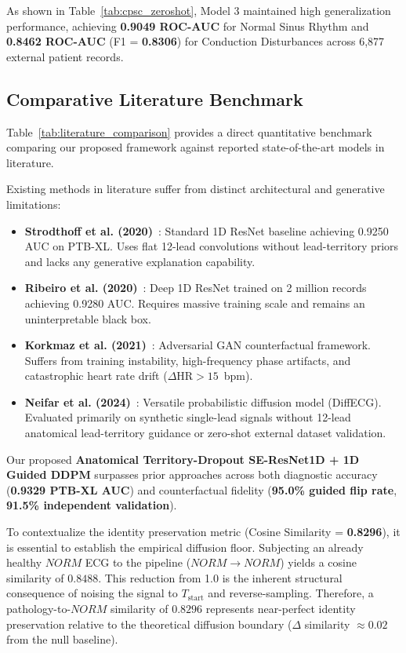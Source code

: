 \documentclass[12pt]{elsarticle}
\begin{document}
As shown in Table~\ref{tab:cpsc_zeroshot}, Model 3 maintained high generalization performance, achieving \textbf{0.9049 ROC-AUC} for Normal Sinus Rhythm and \textbf{0.8462 ROC-AUC} (F1 = \textbf{0.8306}) for Conduction Disturbances across 6,877 external patient records.

\subsection{Comparative Literature Benchmark}
Table~\ref{tab:literature_comparison} provides a direct quantitative benchmark comparing our proposed framework against reported state-of-the-art models in literature.

Existing methods in literature suffer from distinct architectural and generative limitations:
\begin{itemize}
    \item \textbf{Strodthoff et al. (2020)}~\cite{strodthoff2020deep}: Standard 1D ResNet baseline achieving 0.9250 AUC on PTB-XL. Uses flat 12-lead convolutions without lead-territory priors and lacks any generative explanation capability.
    \item \textbf{Ribeiro et al. (2020)}~\cite{ribeiro2020automatic}: Deep 1D ResNet trained on 2 million records achieving 0.9280 AUC. Requires massive training scale and remains an uninterpretable black box.
    \item \textbf{Korkmaz et al. (2021)}~\cite{korkmaz2021deep}: Adversarial GAN counterfactual framework. Suffers from training instability, high-frequency phase artifacts, and catastrophic heart rate drift ($\Delta\text{HR} > 15$~bpm).
    \item \textbf{Neifar et al. (2024)}~\cite{neifar2024diffecg}: Versatile probabilistic diffusion model (DiffECG). Evaluated primarily on synthetic single-lead signals without 12-lead anatomical lead-territory guidance or zero-shot external dataset validation.
\end{itemize}

Our proposed \textbf{Anatomical Territory-Dropout SE-ResNet1D + 1D Guided DDPM} surpasses prior approaches across both diagnostic accuracy (\textbf{0.9329 PTB-XL AUC}) and counterfactual fidelity (\textbf{95.0\% guided flip rate}, \textbf{91.5\% independent validation}). 

To contextualize the identity preservation metric (Cosine Similarity = \textbf{0.8296}), it is essential to establish the empirical diffusion floor. Subjecting an already healthy $NORM$ ECG to the pipeline ($NORM \to NORM$) yields a cosine similarity of $0.8488$. This reduction from 1.0 is the inherent structural consequence of noising the signal to $T_{\text{start}}$ and reverse-sampling. Therefore, a pathology-to-$NORM$ similarity of $0.8296$ represents near-perfect identity preservation relative to the theoretical diffusion boundary ($\Delta$ similarity $\approx 0.02$ from the null baseline).
\end{document}
